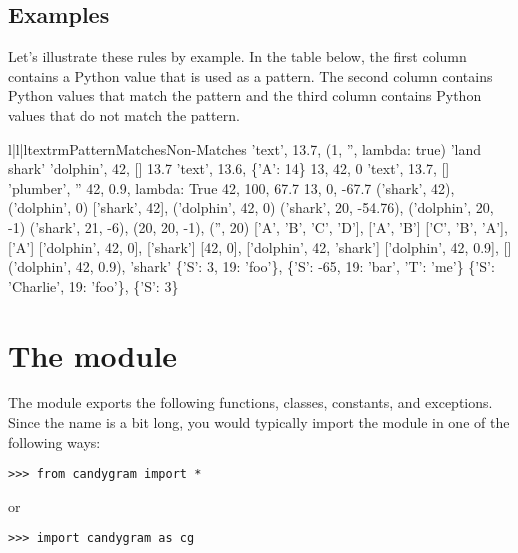\documentclass{howto}
\newcommand{\lessthan}[0]{\begin{math}<\end{math}}
\newcommand{\greaterthan}[0]{\begin{math}>\end{math}}
\newcommand{\lessthan}[0]{<}
\newcommand{\greaterthan}[0]{>}
\begin{document}
\subsection{Examples}
Let's illustrate these rules by example. In the table below, the first column
contains a Python value that is used as a pattern. The second column contains
Python values that match the pattern and the third column contains Python values
that do not match the pattern.
\begin{tableiii}{l|l|l}{textrm}{Pattern}{Matches}{Non-Matches}
	{'text', 13.7, (1, '', lambda: true)}
	{}
	{'land shark'}
	{'dolphin', 42, []}
	{13.7}
	{'text', 13.6, \{'A': 14\}}
	{13, 42, 0}
	{'text', 13.7, []}
	{'plumber', ''}
	{42, 0.9, lambda: True}
\lineiii{lambda x: x \greaterthan\ 20}
	{42, 100, 67.7}
	{13, 0, -67.7}
	{('shark', 42), ('dolphin', 0)}
	{['shark', 42], ('dolphin', 42, 0)}
\lineiii{(str, 20, lambda x: x \lessthan\ 0)}
	{('shark', 20, -54.76), ('dolphin', 20, -1)}
	{('shark', 21, -6), (20, 20, -1), ('', 20)}
	{['A', 'B', 'C', 'D'], ['A', 'B']}
	{['C', 'B', 'A'], ['A']}
	{['dolphin', 42, 0], ['shark']}
	{[42, 0], ['dolphin', 42, 'shark']}
\lineiii{[Any]}
	{['dolphin', 42, 0.9], []}
	{('dolphin', 42, 0.9), 'shark'}
	{\{'S': 3, 19: 'foo'\}, \{'S': -65, 19: 'bar', 'T': 'me'\}}
	{\{'S': 'Charlie', 19: 'foo'\}, \{'S': 3\}}
\end{tableiii}



\section{The  module}


The  module exports the following functions, classes,
constants, and exceptions. Since the name  is a bit long, you
would typically import the module in one of the following ways:
\begin{verbatim}
>>> from candygram import *
\end{verbatim}
or
\begin{verbatim}
>>> import candygram as cg
\end{verbatim}
\end{document}
